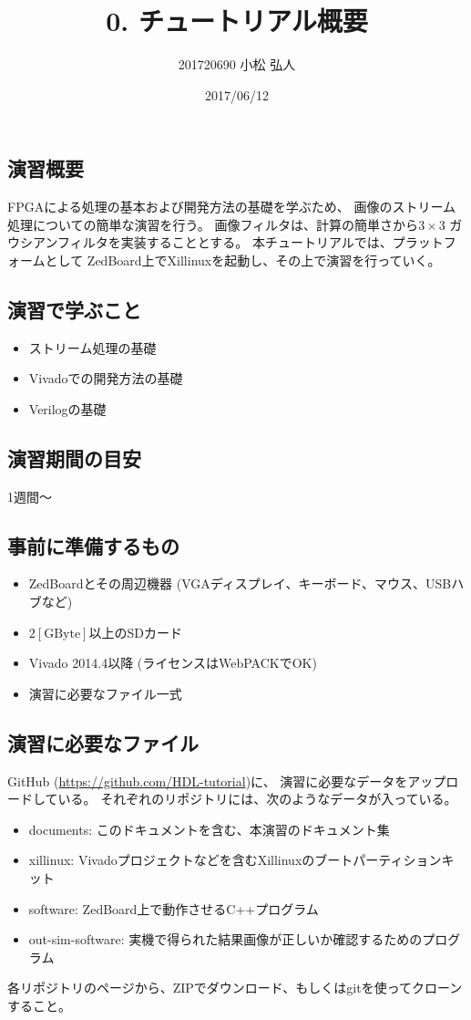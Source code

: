 \documentclass[11pt]{jsarticle}
\title{0. チュートリアル概要}
\author{201720690 小松 弘人}
\date{2017/06/12}
\begin{document}
\maketitle
\subsection*{演習概要}
FPGAによる処理の基本および開発方法の基礎を学ぶため、
画像のストリーム処理についての簡単な演習を行う。
画像フィルタは、計算の簡単さから$3\!\times\!3$
ガウシアンフィルタを実装することとする。
本チュートリアルでは、プラットフォームとして
ZedBoard上でXillinuxを起動し、その上で演習を行っていく。

\subsection*{演習で学ぶこと}
\begin{itemize}
	\item
		ストリーム処理の基礎
	\item
		Vivadoでの開発方法の基礎
	\item
		Verilogの基礎
\end{itemize}

\subsection*{演習期間の目安}
1週間～

\subsection*{事前に準備するもの}
\begin{itemize}
	\item
		ZedBoardとその周辺機器 (VGAディスプレイ、キーボード、マウス、USBハブなど)
	\item
		$2\mathrm{[GByte]}$以上のSDカード
	\item
		Vivado 2014.4以降 (ライセンスはWebPACKでOK)
	\item
		演習に必要なファイル一式
\end{itemize}

\subsection*{演習に必要なファイル}
GitHub (\url{https://github.com/HDL-tutorial})に、
演習に必要なデータをアップロードしている。
それぞれのリポジトリには、次のようなデータが入っている。

\begin{itemize}
	\item
		documents: このドキュメントを含む、本演習のドキュメント集
	\item
		xillinux: Vivadoプロジェクトなどを含むXillinuxのブートパーティションキット
	\item
		software: ZedBoard上で動作させるC++プログラム
	\item
		out-sim-software: 実機で得られた結果画像が正しいか確認するためのプログラム
\end{itemize}

各リポジトリのページから、ZIPでダウンロード、もしくはgitを使ってクローンすること。
\end{document}
